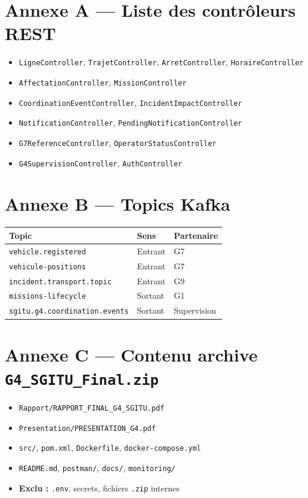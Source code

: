 \documentclass[12pt,a4paper]{report}
\begin{document}
\chapter{Annexe A — Liste des contrôleurs REST}
\begin{itemize}[leftmargin=*]
    \item \texttt{LigneController}, \texttt{TrajetController}, \texttt{ArretController}, \texttt{HoraireController}
    \item \texttt{AffectationController}, \texttt{MissionController}
    \item \texttt{CoordinationEventController}, \texttt{IncidentImpactController}
    \item \texttt{NotificationController}, \texttt{PendingNotificationController}
    \item \texttt{G7ReferenceController}, \texttt{OperatorStatusController}
    \item \texttt{G4SupervisionController}, \texttt{AuthController}
\end{itemize}

\chapter{Annexe B — Topics Kafka}
\begin{center}
\small
\begin{tabular}{@{}lll@{}}
\toprule
\textbf{Topic} & \textbf{Sens} & \textbf{Partenaire} \\
\midrule
\texttt{vehicle.registered} & Entrant & G7 \\
\texttt{vehicule-positions} & Entrant & G7 \\
\texttt{incident.transport.topic} & Entrant & G9 \\
\texttt{missions-lifecycle} & Sortant & G1 \\
\texttt{sgitu.g4.coordination.events} & Sortant & Supervision \\
\bottomrule
\end{tabular}
\end{center}

\chapter{Annexe C — Contenu archive \texttt{G4\_SGITU\_Final.zip}}
\begin{itemize}[leftmargin=*]
    \item \texttt{Rapport/RAPPORT\_FINAL\_G4\_SGITU.pdf}
    \item \texttt{Presentation/PRESENTATION\_G4.pdf}
    \item \texttt{src/}, \texttt{pom.xml}, \texttt{Dockerfile}, \texttt{docker-compose.yml}
    \item \texttt{README.md}, \texttt{postman/}, \texttt{docs/}, \texttt{monitoring/}
    \item \textbf{Exclu :} \texttt{.env}, secrets, fichiers \texttt{.zip} internes
\end{itemize}
\end{document}
